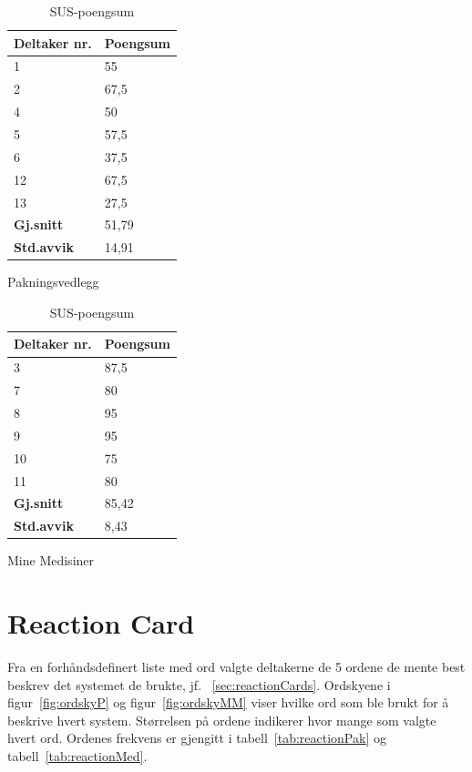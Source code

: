 \begin{table}[H]	
	\centering
\begin{subtable}[b]{2in}
    \centering
    \begin{tabular}{ | p{2cm} | p{2cm} | }
      \hline
       \textbf{Deltaker nr.} & \textbf{Poengsum} \\ \hline
        1 & 55\\ \hline
        2 & 67,5 \\ \hline
        4 & 50 \\ \hline
        5 & 57,5 \\ \hline
        6 & 37,5 \\ \hline
        12 & 67,5 \\ \hline
        13 & 27,5\\ \hline \hline
        \textbf{Gj.snitt} & 51,79\\ \hline
        \textbf{Std.avvik} & 14,91 \\ \hline
    \end{tabular}
    \caption{Pakningsvedlegg}
    \label{tab:SUSPak}
\end{subtable}
\quad
\begin{subtable}[b]{2in}
    \centering
    \begin{tabular}{ | p{2cm} | p{2cm} | }
      \hline
       \textbf{Deltaker nr.} & \textbf{Poengsum} \\ \hline
        3 & 87,5\\ \hline
        7 & 80\\ \hline
        8 & 95\\ \hline
        9 & 95\\ \hline
        10 & 75\\ \hline
        11 & 80\\ \hline \hline
        \textbf{Gj.snitt} & 85,42\\ \hline
        \textbf{Std.avvik} & 8,43 \\ \hline
    \end{tabular}
    \caption{Mine Medisiner}
    \label{tab:SUSMineMed}
\end{subtable}
 \caption{SUS-poengsum}\label{tab:SUS}
\end{table}

\section{Reaction Card}
Fra en forhåndsdefinert liste med ord valgte deltakerne de 5 ordene de mente best beskrev det systemet de brukte, jf. ~\ref{sec:reactionCards}. Ordskyene i figur~\ref{fig:ordskyP} og figur~\ref{fig:ordskyMM} viser hvilke ord som ble brukt for å beskrive hvert system. Størrelsen på ordene indikerer hvor mange som valgte hvert ord. Ordenes frekvens er gjengitt i tabell~\ref{tab:reactionPak} og tabell~\ref{tab:reactionMed}. 

